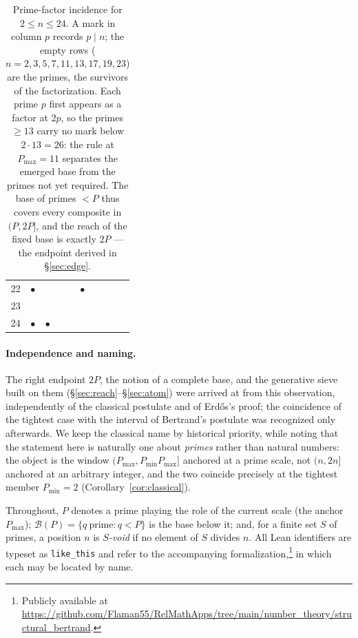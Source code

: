 \documentclass[11pt,a4paper]{amsart}
\theoremstyle{plain}
\theoremstyle{definition}
\theoremstyle{plain}
\theoremstyle{remark}
\newcommand{\lean}[1]{\textup{\texttt{#1}}}
\begin{document}
\begin{table}[htbp]
\begin{tabular}{r|ccccc|cccc}
22 & $\bullet$  &            &            &            & $\bullet$  & & & &\\
23 &            &            &            &            &            & & & &\\
24 & $\bullet$  & $\bullet$  &            &            &            & & & &\\
\end{tabular}
\caption{Prime-factor incidence for $2\le n\le 24$. A mark in column $p$ records $p\mid n$;
the empty rows ($n=2,3,5,7,11,13,17,19,23$) are the primes, the survivors of the
factorization. Each prime $p$ first appears as a factor at $2p$, so the primes $\ge 13$ carry
no mark below $2\cdot13=26$: the rule at $P_{\max}=11$ separates the emerged base from the
primes not yet required. The base of primes $<P$ thus covers every composite in $(P,2P]$, and
the reach of the fixed base is exactly $2P$ --- the endpoint derived in \S\ref{sec:edge}.}
\label{tab:incidence}
\end{table}

\paragraph{Independence and naming.}
The right endpoint $2P$, the notion of a complete base, and the generative sieve built on
them (\S\ref{sec:reach}--\S\ref{sec:atom}) were arrived at from this observation,
independently of the classical postulate and of Erd\H{o}s's proof; the coincidence of the
tightest case with the interval of Bertrand's postulate was recognized only afterwards. We
keep the classical name by historical priority, while noting that the statement here is
naturally one about \emph{primes} rather than natural numbers: the object is the window
$(P_{\max},P_{\min}P_{\max}]$ anchored at a prime scale, not $(n,2n]$ anchored at an
arbitrary integer, and the two coincide precisely at the tightest member $P_{\min}=2$
(Corollary~\ref{cor:classical}).

Throughout, $P$ denotes a prime playing the role of the current scale (the anchor
$P_{\max}$); $\mathcal{B}(P)=\{q\ \text{prime}: q<P\}$ is the base below it; and, for a
finite set $S$ of primes, a position $n$ is \emph{$S$-void} if no element of $S$ divides
$n$. All Lean identifiers are typeset as \lean{like\_this} and refer to the accompanying
formalization,\footnote{Publicly available at
\url{https://github.com/Flaman55/RelMathApps/tree/main/number_theory/structural_bertrand}.}
in which each may be located by name.
\end{document}
